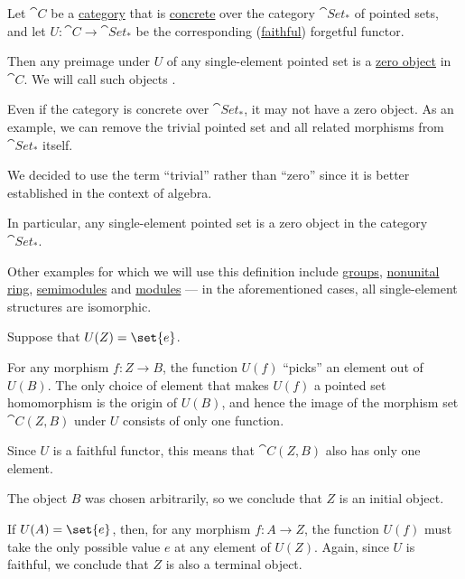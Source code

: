 \begin{definition}\label{def:trivial_object}
  Let \( \cat{C} \) be a \hyperref[def:category]{category} that is \hyperref[def:concrete_category]{concrete} over the category \hyperref[def:pointed_set/category]{\( \cat{Set}_* \)} of pointed sets, and let \( U: \cat{C} \to \cat{Set}_* \) be the corresponding (\hyperref[def:functor_invertibility/faithful]{faithful}) forgetful functor.

  Then any preimage under \( U \) of any single-element pointed set is a \hyperref[def:universal_objects/zero]{zero object} in \( \cat{C} \). We will call such objects .
\end{definition}
\begin{comments}
  \item Even if the category is concrete over \( \cat{Set}_* \), it may not have a zero object. As an example, we can remove the trivial pointed set and all related morphisms from \( \cat{Set}_* \) itself.
  \item We decided to use the term \enquote{trivial} rather than \enquote{zero} since it is better established in the context of algebra.
  \item In particular, any single-element pointed set is a zero object in the category \( \cat{Set}_* \).
  \item Other examples for which we will use this definition include \hyperref[def:group]{groups}, \hyperref[def:ring]{nonunital ring}, \hyperref[def:semimodule]{semimodules} and \hyperref[def:module]{modules} --- in the aforementioned cases, all single-element structures are isomorphic.
\end{comments}
\begin{defproof}
  Suppose that \( U(Z) = \set{ e } \).

   For any morphism \( f: Z \to B \), the function \( U(f) \) \enquote{picks} an element out of \( U(B) \). The only choice of element that makes \( U(f) \) a pointed set homomorphism is the origin of \( U(B) \), and hence the image of the morphism set \( \cat{C}(Z, B) \) under \( U \) consists of only one function.

  Since \( U \) is a faithful functor, this means that \( \cat{C}(Z, B) \) also has only one element.

  The object \( B \) was chosen arbitrarily, so we conclude that \( Z \) is an initial object.

   If \( U(A) = \set{ e } \), then, for any morphism \( f: A \to Z \), the function \( U(f) \) must take the only possible value \( e \) at any element of \( U(Z) \). Again, since \( U \) is faithful, we conclude that \( Z \) is also a terminal object.
\end{defproof}

